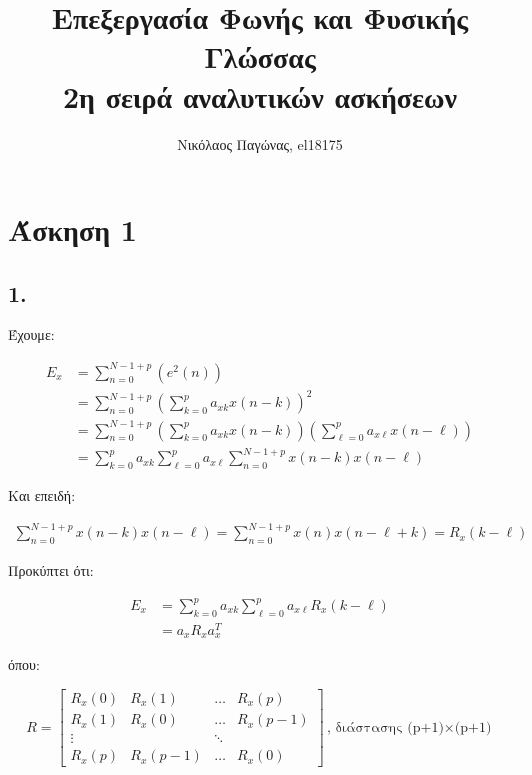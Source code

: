 \documentclass[12pt,a4paper]{article}
\title{Επεξεργασία Φωνής και Φυσικής Γλώσσας \\ 2η σειρά αναλυτικών ασκήσεων}
\author{Νικόλαος Παγώνας, el18175}
\date{}
\begin{document}
	\maketitle	
	
	\section*{Άσκηση 1} 
		
		\subsection*{1.}
			Έχουμε:
			
			\begin{align*}
				E_x &= \sum_{n=0}^{N-1+p}\left(e^2\left(n\right)\right) \\ 
					&= \sum_{n=0}^{N-1+p}\left(\sum_{k=0}^{p}a_{xk}x\left(n-k\right)\right)^2 \\ 
					&= \sum_{n=0}^{N-1+p}\left(\sum_{k=0}^{p}a_{xk}x\left(n-k\right)\right)\left(\sum_{\ell=0}^{p}a_{x\ell}x\left(n-\ell\right)\right) \\ 
					&= \sum_{k=0}^{p}a_{xk}\sum_{\ell=0}^{p}a_{x\ell}\sum_{n=0}^{N-1+p}x\left(n-k\right)x\left(n-\ell\right) 
			\end{align*}
			
			Και επειδή:
			
			\begin{align*}
				\sum_{n=0}^{N-1+p}x\left(n-k\right)x\left(n-\ell\right) = \sum_{n=0}^{N-1+p}x\left(n\right)x\left(n-\ell+k\right)=R_x\left(k-\ell\right)
			\end{align*}
			
			Προκύπτει ότι:
			
			\begin{align*}
				E_x &= \sum_{k=0}^{p}a_{xk} \sum_{\ell=0}^{p}a_{x\ell}R_x\left(k-\ell\right) \\
				&= a_xR_xa_x^T
			\end{align*}
			
			όπου:
			
			\[
				R = \begin{bmatrix}
					R_x\left(0\right) & R_x\left(1\right) & \dots & R_x\left(p\right) \\
					R_x\left(1\right) & R_x\left(0\right) & \dots & R_x\left(p-1\right) \\
					\vdots & & \ddots \\
					R_x\left(p\right) & R_x\left(p-1\right) & \dots & R_x\left(0\right)
				\end{bmatrix}  \text{, διάστασης (p+1)$\times$(p+1)}
			\]
			
\end{document}
